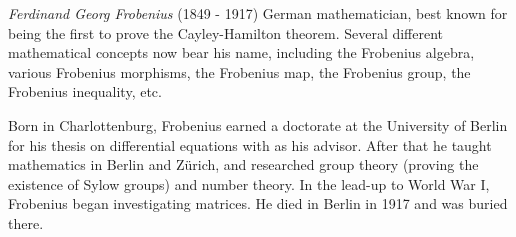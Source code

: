 \documentclass[12pt]{article}
\begin{document}
\emph{Ferdinand Georg Frobenius} (1849 - 1917) German mathematician, best known for being the first to prove the Cayley-Hamilton theorem. Several different mathematical concepts now bear his name, including the Frobenius algebra, various Frobenius morphisms, the Frobenius map, the Frobenius group, the Frobenius inequality, etc.

Born in Charlottenburg, Frobenius earned a doctorate at the University of Berlin for his thesis on differential equations with  as his advisor. After that he taught mathematics in Berlin and Z\"urich, and researched group theory (proving the existence of Sylow groups) and number theory. In the lead-up to World War I, Frobenius began investigating matrices. He died in Berlin in 1917 and was buried there.
\end{document}
